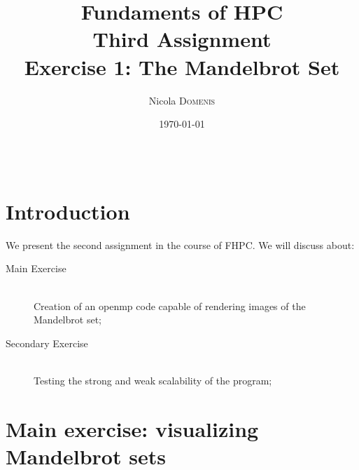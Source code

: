 \documentclass{article}
\title{Fundaments of HPC \\ Third Assignment \\ Exercise 1: The Mandelbrot Set} %
\author{Nicola \textsc{Domenis}} %
\date{\today} %
\begin{document}
\maketitle %

\begin{center}
\begin{tabular}{l r}

\end{tabular}
\end{center}



\section{Introduction}

We present the second assignment in the course of FHPC. We will discuss about:


\begin{description}
\item[Main Exercise] \hfill \\
Creation of an openmp code capable of rendering images of the Mandelbrot set;
\item[Secondary Exercise] \hfill \\
Testing the strong and weak scalability of the program;

\end{description} 
 

\section{Main exercise: visualizing Mandelbrot sets}
\end{document}
